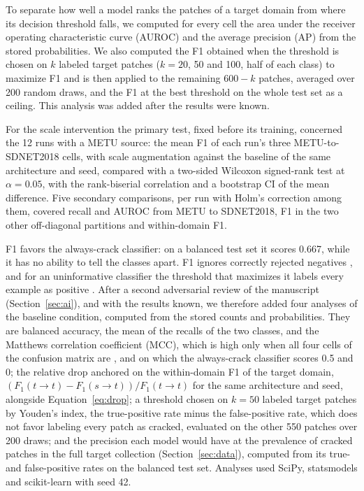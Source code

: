 \documentclass[pdflatex,sn-apa]{sn-jnl}
\begin{document}
To separate how well a model ranks the patches of a target domain from where its decision threshold falls, we computed for every cell the area under the receiver operating characteristic curve (AUROC) and the average precision (AP) from the stored probabilities. We also computed the F1 obtained when the threshold is chosen on $k$ labeled target patches ($k=20$, 50 and 100, half of each class) to maximize F1 and is then applied to the remaining $600-k$ patches, averaged over 200 random draws, and the F1 at the best threshold on the whole test set as a ceiling. This analysis was added after the results were known.

For the scale intervention the primary test, fixed before its training, concerned the 12 runs with a METU source: the mean F1 of each run's three METU-to-SDNET2018 cells, with scale augmentation against the baseline of the same architecture and seed, compared with a two-sided Wilcoxon signed-rank test at $\alpha=0.05$, with the rank-biserial correlation and a bootstrap CI of the mean difference. Five secondary comparisons, per run with Holm's correction among them, covered recall and AUROC from METU to SDNET2018, F1 in the two other off-diagonal partitions and within-domain F1.

F1 favors the always-crack classifier: on a balanced test set it scores 0.667, while it has no ability to tell the classes apart. F1 ignores correctly rejected negatives \citep{chicco2020}, and for an uninformative classifier the threshold that maximizes it labels every example as positive \citep{lipton2014}. After a second adversarial review of the manuscript (Section~\ref{sec:ai}), and with the results known, we therefore added four analyses of the baseline condition, computed from the stored counts and probabilities. They are balanced accuracy, the mean of the recalls of the two classes, and the Matthews correlation coefficient (MCC), which is high only when all four cells of the confusion matrix are \citep{chicco2020}, and on which the always-crack classifier scores 0.5 and 0; the relative drop anchored on the within-domain F1 of the target domain, $(F_1(t\to t)-F_1(s\to t))/F_1(t\to t)$ for the same architecture and seed, alongside Equation~\ref{eq:drop}; a threshold chosen on $k=50$ labeled target patches by Youden's index, the true-positive rate minus the false-positive rate, which does not favor labeling every patch as cracked, evaluated on the other 550 patches over 200 draws; and the precision each model would have at the prevalence of cracked patches in the full target collection (Section~\ref{sec:data}), computed from its true- and false-positive rates on the balanced test set. Analyses used SciPy, statsmodels and scikit-learn with seed 42.
\end{document}
